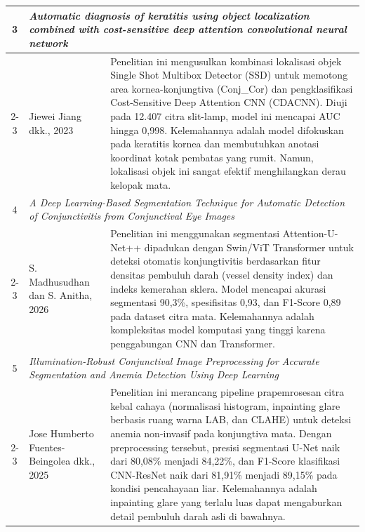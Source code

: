 \begin{longtable}{|c|p{4.5cm}|p{8.5cm}|}
  3 & \multicolumn{2}{p{13.3cm}|}{\textit{Automatic diagnosis of keratitis using object localization combined with cost-sensitive deep attention convolutional neural network}} \\
  \cline{2-3}
    & Jiewei Jiang dkk., 2023 \parencite{jiang2023automatic} & 
    Penelitian ini mengusulkan kombinasi lokalisasi objek Single Shot Multibox Detector (SSD) untuk memotong area kornea-konjungtiva (Conj\_Cor) dan pengklasifikasi Cost-Sensitive Deep Attention CNN (CDACNN). Diuji pada 12.407 citra slit-lamp, model ini mencapai AUC hingga 0,998. Kelemahannya adalah model difokuskan pada keratitis kornea dan membutuhkan anotasi koordinat kotak pembatas yang rumit. Namun, lokalisasi objek ini sangat efektif menghilangkan derau kelopak mata. \\
  \hline

  4 & \multicolumn{2}{p{13.3cm}|}{\textit{A Deep Learning-Based Segmentation Technique for Automatic Detection of Conjunctivitis from Conjunctival Eye Images}} \\
  \cline{2-3}
    & S. Madhusudhan dan S. Anitha, 2026 \parencite{madhusudhan2026deep} & 
    Penelitian ini menggunakan segmentasi Attention-U-Net++ dipadukan dengan Swin/ViT Transformer untuk deteksi otomatis konjungtivitis berdasarkan fitur densitas pembuluh darah (vessel density index) dan indeks kemerahan sklera. Model mencapai akurasi segmentasi 90,3\%, spesifisitas 0,93, dan F1-Score 0,89 pada dataset citra mata. Kelemahannya adalah kompleksitas model komputasi yang tinggi karena penggabungan CNN dan Transformer. \\
  \hline

  5 & \multicolumn{2}{p{13.3cm}|}{\textit{Illumination-Robust Conjunctival Image Preprocessing for Accurate Segmentation and Anemia Detection Using Deep Learning}} \\
  \cline{2-3}
    & Jose Humberto Fuentes-Beingolea dkk., 2025 \parencite{fuentes2025illumination} & 
    Penelitian ini merancang pipeline prapemrosesan citra kebal cahaya (normalisasi histogram, inpainting glare berbasis ruang warna LAB, dan CLAHE) untuk deteksi anemia non-invasif pada konjungtiva mata. Dengan preprocessing tersebut, presisi segmentasi U-Net naik dari 80,08\% menjadi 84,22\%, dan F1-Score klasifikasi CNN-ResNet naik dari 81,91\% menjadi 89,15\% pada kondisi pencahayaan liar. Kelemahannya adalah inpainting glare yang terlalu luas dapat mengaburkan detail pembuluh darah asli di bawahnya. \\
  \hline

\end{longtable}

